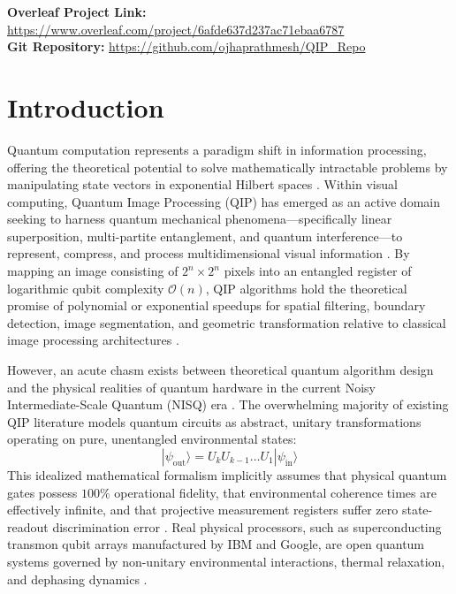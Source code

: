 \documentclass[12pt,onecolumn,draftclsnofoot]{IEEEtran}
\begin{document}
\noindent\textbf{Overleaf Project Link:} \url{https://www.overleaf.com/project/6afde637d237ac71ebaa6787} \\
\noindent\textbf{Git Repository:} \url{https://github.com/ojhaprathmesh/QIP_Repo}

\section{Introduction}
Quantum computation represents a paradigm shift in information processing, offering the theoretical potential to solve mathematically intractable problems by manipulating state vectors in exponential Hilbert spaces \cite{nielsen2010quantum, preskill2018quantum}. Within visual computing, Quantum Image Processing (QIP) has emerged as an active domain seeking to harness quantum mechanical phenomena—specifically linear superposition, multi-partite entanglement, and quantum interference—to represent, compress, and process multidimensional visual information \cite{le2011flexible, zhang2013neqr, yao2017quantum}. By mapping an image consisting of $2^n \times 2^n$ pixels into an entangled register of logarithmic qubit complexity $\mathcal{O}(n)$, QIP algorithms hold the theoretical promise of polynomial or exponential speedups for spatial filtering, boundary detection, image segmentation, and geometric transformation relative to classical image processing architectures \cite{jiang2015quantum, caraiman2014histogram, yan2016quantum}.

However, an acute chasm exists between theoretical quantum algorithm design and the physical realities of quantum hardware in the current Noisy Intermediate-Scale Quantum (NISQ) era \cite{preskill2018quantum}. The overwhelming majority of existing QIP literature models quantum circuits as abstract, unitary transformations operating on pure, unentangled environmental states:
\begin{equation}
|\psi_{\text{out}}\rangle = U_k U_{k-1} \dots U_1 |\psi_{\text{in}}\rangle
\end{equation}
This idealized mathematical formalism implicitly assumes that physical quantum gates possess $100\%$ operational fidelity, that environmental coherence times are effectively infinite, and that projective measurement registers suffer zero state-readout discrimination error \cite{magesan2011scalable}. Real physical processors, such as superconducting transmon qubit arrays manufactured by IBM and Google, are open quantum systems governed by non-unitary environmental interactions, thermal relaxation, and dephasing dynamics \cite{kandala2017hardware, cross2019validating}.
\end{document}
